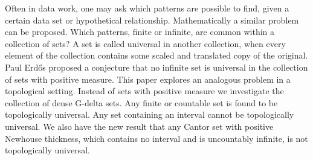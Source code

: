 %

Often in data work, one may ask which patterns are possible to find, given a certain data set or hypothetical relationship.  Mathematically a similar problem can be proposed.  Which patterns, finite or infinite, are common within a collection of sets?  A set is called universal in another collection, when every element of the collection contains some scaled and translated copy of the original.  Paul Erd\H{o}s proposed a conjecture that no infinite set is universal in the  collection of sets with positive measure.  This paper explores an analogous problem in a topological setting. Instead of sets with positive measure we investigate the collection of dense G-delta sets.  Any finite or countable set is found to be topologically universal.  Any set containing an interval cannot be topologically universal.  We also have the new result that any Cantor set with positive Newhouse thickness, which contains no interval and is uncountably infinite, is not topologically universal.  



%